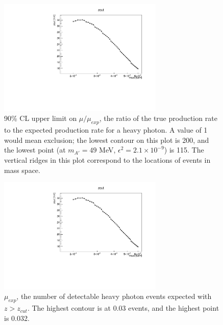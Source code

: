 \begin{figure}[ht]
\begin{center}
    \includegraphics[width=0.7\textwidth,page=15,angle=-90]{vertexing/figs/golden_mres_output}
\end{center}
\caption{90\% CL upper limit on $\mu/\mu_{exp}$, the ratio of the true production rate to the expected production rate for a heavy photon. A value of 1 would mean exclusion; the lowest contour on this plot is 200, and the lowest point (at $m_{A'}=49$ MeV, $\epsilon^2=2.1\times 10^{-9}$) is 115.
    The vertical ridges in this plot correspond to the locations of events in mass space.}
    \label{fig:upper_limit}
\end{figure}

\begin{figure}[ht]
\begin{center}
    \includegraphics[width=0.7\textwidth,page=16,angle=-90]{vertexing/figs/golden_mres_output}
\end{center}
    \caption{$\mu_{exp}$, the number of detectable heavy photon events expected with $z>z_{cut}$. The highest contour is at 0.03 events, and the highest point is 0.032.}
    \label{fig:detectable}
\end{figure}

